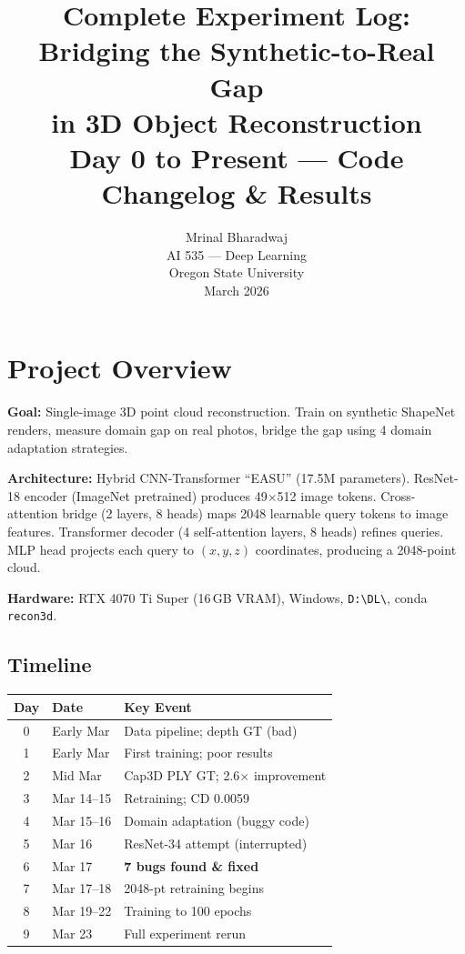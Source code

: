 \documentclass[10pt,twocolumn,letterpaper]{article}
\title{\textbf{Complete Experiment Log:}\\
\textbf{Bridging the Synthetic-to-Real Gap}\\
\textbf{in 3D Object Reconstruction}\\[6pt]
\large Day 0 to Present --- Code Changelog \& Results}
\author{Mrinal Bharadwaj\\
AI 535 --- Deep Learning\\
Oregon State University\\
March 2026}
\date{}
\begin{document}
\maketitle
\thispagestyle{fancy}

\section{Project Overview}

\textbf{Goal:} Single-image 3D point cloud reconstruction. Train on synthetic ShapeNet renders, measure domain gap on real photos, bridge the gap using 4 domain adaptation strategies.

\textbf{Architecture:} Hybrid CNN-Transformer ``EASU'' (17.5M parameters). ResNet-18 encoder (ImageNet pretrained) produces 49$\times$512 image tokens. Cross-attention bridge (2 layers, 8 heads) maps 2048 learnable query tokens to image features. Transformer decoder (4 self-attention layers, 8 heads) refines queries. MLP head projects each query to $(x,y,z)$ coordinates, producing a 2048-point cloud.

\textbf{Hardware:} RTX 4070 Ti Super (16\,GB VRAM), Windows, \texttt{D:\textbackslash DL\textbackslash}, conda \texttt{recon3d}.

\subsection{Timeline}

\begin{table}[h]
\centering
\scriptsize
\begin{tabular}{@{}clp{3.8cm}@{}}
\toprule
\textbf{Day} & \textbf{Date} & \textbf{Key Event} \\
\midrule
0 & Early Mar & Data pipeline; depth GT (bad) \\
1 & Early Mar & First training; poor results \\
2 & Mid Mar & Cap3D PLY GT; 2.6$\times$ improvement \\
3 & Mar 14--15 & Retraining; CD 0.0059 \\
4 & Mar 15--16 & Domain adaptation (buggy code) \\
5 & Mar 16 & ResNet-34 attempt (interrupted) \\
6 & Mar 17 & \textbf{7 bugs found \& fixed} \\
7 & Mar 17--18 & 2048-pt retraining begins \\
8 & Mar 19--22 & Training to 100 epochs \\
9 & Mar 23 & Full experiment rerun \\
\bottomrule
\end{tabular}
\end{table}
\end{document}
